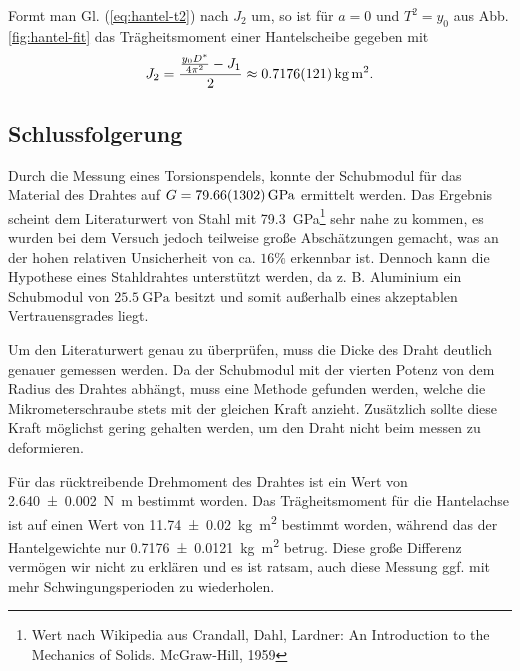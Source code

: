 Formt man Gl. (\ref{eq:hantel-t2}) nach $J_2$ um, so ist für $a = 0$ und $T^2 = y_0$ aus Abb. \ref{fig:hantel-fit} das Trägheitsmoment einer Hantelscheibe gegeben mit
\begin{equation}
	J_2 = \frac{\frac{y_0 D^*}{4 \pi^2} - J_1}{2} \approx \SI{0,7176 +- 0,0121}{\kilogram\meter\squared}.
\end{equation}

\subsection{Schlussfolgerung}
Durch die Messung eines Torsionspendels, konnte der Schubmodul für das Material des Drahtes auf $G = \SI{79,66+-13,02}{\giga\pascal}$ ermittelt werden.
Das Ergebnis scheint dem Literaturwert von Stahl mit \SI{79,3}{\giga\pascal}\footnote{Wert nach Wikipedia aus Crandall, Dahl, Lardner: An Introduction to the Mechanics of Solids. McGraw-Hill, 1959} sehr nahe zu kommen, es wurden bei dem Versuch jedoch teilweise große Abschätzungen gemacht, was an der hohen relativen Unsicherheit von ca. $16\%$ erkennbar ist.
Dennoch kann die Hypothese eines Stahldrahtes unterstützt werden, da z. B. Aluminium ein Schubmodul von $\SI{25,5}{\giga\pascal}$ besitzt und somit außerhalb eines akzeptablen Vertrauensgrades liegt.

Um den Literaturwert genau zu überprüfen, muss die Dicke des Draht deutlich genauer gemessen werden.
Da der Schubmodul mit der vierten Potenz von dem Radius des Drahtes abhängt, muss eine Methode gefunden werden, welche die Mikrometerschraube stets mit der gleichen Kraft anzieht.
Zusätzlich sollte diese Kraft möglichst gering gehalten werden, um den Draht nicht beim messen zu deformieren.

Für das rücktreibende Drehmoment des Drahtes ist ein Wert von \SI{2,640+-0,002}{\newton\meter} bestimmt worden.
Das Trägheitsmoment für die Hantelachse ist auf einen Wert von \SI{11,74 +- 0,02}{\kilogram\meter\squared} bestimmt worden, während das der Hantelgewichte nur \SI{0,7176 +- 0,0121}{\kilogram\meter\squared} betrug.
Diese große Differenz vermögen wir nicht zu erklären und es ist ratsam, auch diese Messung ggf. mit mehr Schwingungsperioden zu wiederholen.
